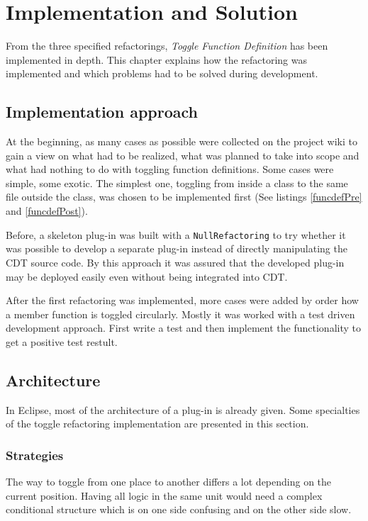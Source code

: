 \chapter{Implementation and Solution}
\thispagestyle{fancy}

From the three specified refactorings, \textit{Toggle Function Definition} has 
been implemented in depth. This chapter explains how the refactoring was 
implemented and which problems had to be solved during development.

\section{Implementation approach}

At the beginning, as many cases as possible were collected on the project wiki 
to gain a view on what had to be realized, what was planned to take into scope 
and what had nothing to do with toggling function definitions. Some cases were 
simple, some exotic. The simplest one, toggling from inside a class to the same 
file outside the class, was chosen to be implemented first (See listings 
\ref{funcdefPre} and \ref{funcdefPost}). 

Before, a skeleton plug-in was built with a \texttt{NullRefactoring} to try
whether it was possible to develop a separate plug-in instead of directly
manipulating the CDT source code. By this approach it was assured that the
developed plug-in may be deployed easily even without being integrated into CDT.

After the first refactoring was implemented, more cases were added by order how
a member function is toggled circularly. Mostly it was worked with a test
driven development approach. First write a test and then implement the
functionality to get a positive test restult.

\section{Architecture}

In Eclipse, most of the architecture of a plug-in is already given. Some
specialties of the toggle refactoring implementation are presented in this
section.

\subsection{Strategies}

The way to toggle from one place to another differs a lot depending on
the current position. Having all logic in the same unit would need a complex
conditional structure which is on one side confusing and on the other side
slow.

